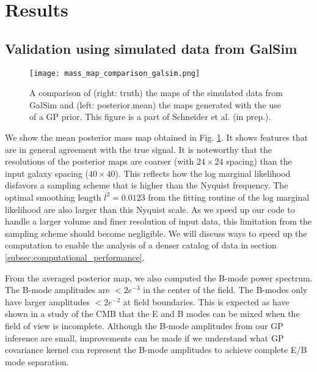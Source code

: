 \section{Results}

\subsection{Validation using simulated data from {\sc GalSim}}
\begin{figure}[!ht]
	\centering
	\texttt{[image: mass\_map\_comparison\_galsim.png]}
	\caption{A comparison of (right: truth) the maps of the simulated data from {\sc GalSim}  and
	(left: posterior.mean) the maps generated with the use of a GP prior. 
	This figure is a part of Schneider et al. (in prep.). \label{fig:Galsim_massmap}
}
\end{figure}
We show the mean posterior mass map obtained in Fig. \ref{fig:Galsim_massmap}. 
It shows features that are in general agreement with the true signal. 
It is noteworthy that the resolutions of the posterior maps are coarser (with $24 \times 24$
spacing) than the input galaxy
spacing ($40 \times 40$). This reflects how the log marginal likelihood disfavors a sampling
scheme that is higher than the Nyquist frequency. The optimal smoothing length
$l^2 = 0.0123$ from the fitting routine of the log marginal likelihood are also
larger than this Nyquist scale. As we speed up our code to handle a larger
volume and finer
resolution of input data, this limitation from the sampling scheme should
become negligible. We will discuss ways to speed up the computation to enable
the analysis of a denser catalog of data in section
\ref{subsec:computational_performance}. 

From the averaged posterior map, we also computed the B-mode power spectrum.
The B-mode amplitudes are $< 2e^{-3}$ in the center of the field. 
The B-modes only have larger amplitudes $< 2e^{-2}$ at field boundaries.  
This is expected as \cite{Bunn2003} have shown in a study of the CMB that 
the E and B modes can be mixed when the field of view is incomplete.
Although the B-mode amplitudes from our GP inference are small, 
improvements can be made 
if we understand what GP covariance kernel can represent the B-mode amplitudes to achieve complete E/B mode
separation.

